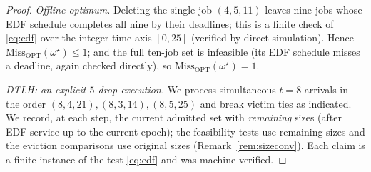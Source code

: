 \documentclass{amsart}
\theoremstyle{definition}
\begin{document}
\begin{proof}
\emph{Offline optimum.} Deleting the single job $(4,5,11)$ leaves nine jobs whose
EDF schedule completes all nine by their deadlines; this is a finite check of
\eqref{eq:edf} over the integer time axis $[0,25]$ (verified by direct
simulation). Hence $\mathrm{Miss}_{\mathrm{OPT}}(\omega^\star)\le1$; and the full
ten-job set is infeasible (its EDF schedule misses a deadline, again checked
directly), so $\mathrm{Miss}_{\mathrm{OPT}}(\omega^\star)=1$.

\emph{DTLH: an explicit $5$-drop execution.} We process simultaneous $t=8$
arrivals in the order $(8,4,21),(8,3,14),(8,5,25)$ and break victim ties as
indicated. We record, at each step, the current admitted set with
\emph{remaining} sizes (after EDF service up to the current epoch); the
feasibility tests use remaining sizes and the eviction comparisons use original
sizes (Remark~\ref{rem:sizeconv}). Each claim is a finite instance of the test
\eqref{eq:edf} and was machine-verified.


\end{proof}
\end{document}
